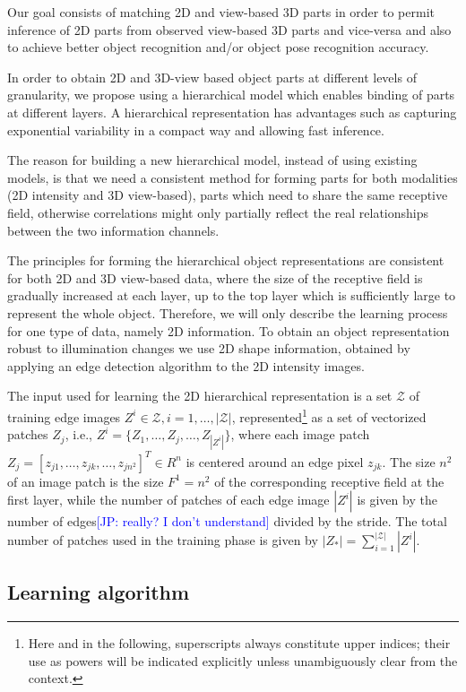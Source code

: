 \documentclass[runningheads]{llncs}
\newcommand{\commentJP}[1]{\textcolor{blue}{[JP: #1]}}
\begin{document}
Our goal consists of matching 2D and view-based 3D parts in order to permit inference of 2D parts from observed view-based 3D parts and vice-versa and also to achieve better object recognition and/or object pose recognition accuracy.  

In order to obtain 2D and 3D-view based object parts at different levels of granularity, we propose using a hierarchical model which enables binding of parts at different layers. A hierarchical representation has advantages such as capturing exponential variability in a compact way and allowing fast inference.

The reason for building a new hierarchical model, instead of using existing models, is that we need a consistent method for forming parts for both modalities (2D intensity and 3D view-based), parts which need to share the same receptive field, otherwise correlations might only partially reflect the real relationships between the two information channels.

The principles for forming the hierarchical object representations are consistent for both 2D and 3D view-based data, where the size of the receptive field is gradually increased at each layer, up to the top layer which is sufficiently large to represent the whole object. Therefore, we will only describe the learning process for one type of data, namely 2D information. To obtain an object representation robust to illumination changes we use 2D shape information, obtained by applying an edge detection algorithm to the 2D intensity images.

The input used for learning the 2D hierarchical representation is a set $\mathcal{Z}$ of training edge images $Z^i \in \mathcal{Z}, i=1,\ldots,|\mathcal{Z}|$, represented\footnote{Here and in the following, superscripts always constitute upper indices; their use as powers will be indicated explicitly unless unambiguously clear from the context.} as a set of vectorized patches $Z_j$, i.e., $Z^i=\{Z_1,\ldots,Z_j,\ldots,Z_{|Z^i|}\}$, where each image patch
$Z_j=[z_{j1},\ldots,z_{jk},\ldots,z_{jn^2}]^T \in R^n$ is centered around an edge pixel $z_{jk}$. The size $n^2$ of an image patch is the size $F^1=n^2$ of the corresponding receptive field at the first layer, while the number of patches of each edge image $|Z^i|$ is given by the number of edges\commentJP{really? I don't understand} divided by the stride. The total number of patches used in the training phase is given by $|Z_*|=\sum_{i=1}^{|\mathcal{Z}|} |Z^i|$.

\subsection{Learning algorithm} 
\end{document}
